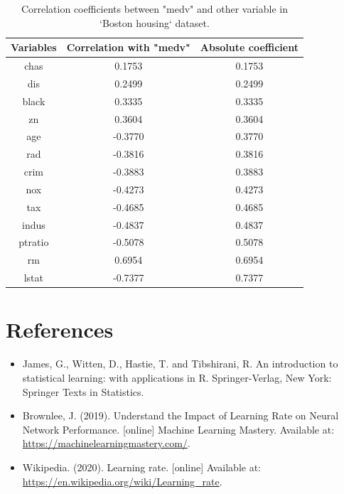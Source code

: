 \documentclass[letterpaper,12pt,twoside,]{pinp}
\begin{document}
\begin{table}[ht]
\centering
\begin{tabular}{ |c|c|c|} 
\hline
\textbf{Variables} & \textbf{Correlation with "medv"} & \textbf{Absolute coefficient}\\
\hline
chas & 0.1753 & 0.1753 \\
dis & 0.2499 & 0.2499 \\
black & 0.3335 & 0.3335 \\
zn & 0.3604 & 0.3604 \\
age & -0.3770 & 0.3770 \\
rad & -0.3816 & 0.3816 \\
crim & -0.3883 & 0.3883 \\
nox & -0.4273 & 0.4273 \\
tax &-0.4685 & 0.4685 \\
indus & -0.4837 & 0.4837 \\
ptratio & -0.5078 & 0.5078 \\
rm & 0.6954 & 0.6954 \\
lstat & -0.7377 & 0.7377 \\
\hline
\end{tabular}
\centering
\caption{Correlation coefficients between "medv" and other variable in `Boston housing` dataset.}
\label{table:corrTab}
\end{table}

\hypertarget{references-1}{%
\section{References}\label{references-1}}

\begin{itemize}
\item
  James, G., Witten, D., Hastie, T. and Tibshirani, R. An introduction
  to statistical learning: with applications in R. Springer-Verlag, New
  York: Springer Texts in Statistics.
\item
  Brownlee, J. (2019). Understand the Impact of Learning Rate on Neural
  Network Performance. {[}online{]} Machine Learning Mastery. Available
  at: \url{https://machinelearningmastery.com/}.
\item
  Wikipedia. (2020). Learning rate. {[}online{]} Available at:
  \url{https://en.wikipedia.org/wiki/Learning_rate}.
\end{itemize}





\end{document}

